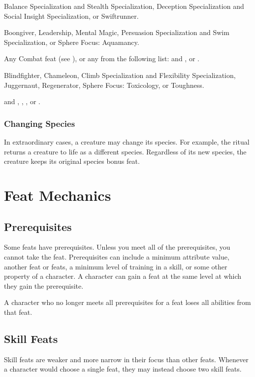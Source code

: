       Balance Specialization and Stealth Specialization, Deception Specialization and Social Insight Specialization, or Swiftrunner.

       Boongiver, Leadership, Mental Magic, Persuasion Specialization and Swim Specialization, or Sphere Focus: Aquamancy.

       Any Combat feat (see ), or any from the following list:  and , or .

       Blindfighter, Chameleon, Climb Specialization and Flexibility Specialization, Juggernaut, Regenerator, Sphere Focus: Toxicology, or Toughness.

        and , , , or .

    \subsubsection{Changing Species}
      In extraordinary cases, a creature may change its species.
      For example, the  ritual returns a creature to life as a different species.
      Regardless of its new species, the creature keeps its original species bonus feat.

\section{Feat Mechanics}

  \subsection{Prerequisites}
    Some feats have prerequisites.
    Unless you meet all of the prerequisites, you cannot take the feat.
    Prerequisites can include a minimum attribute value, another feat or feats, a minimum level of training in a skill, or some other property of a character.
    A character can gain a feat at the same level at which they gain the prerequisite.

    A character who no longer meets all prerequisites for a feat loses all abilities from that feat.

  \subsection{Skill Feats}
    Skill feats are weaker and more narrow in their focus than other feats.
    Whenever a character would choose a single feat, they may instead choose two skill feats.


